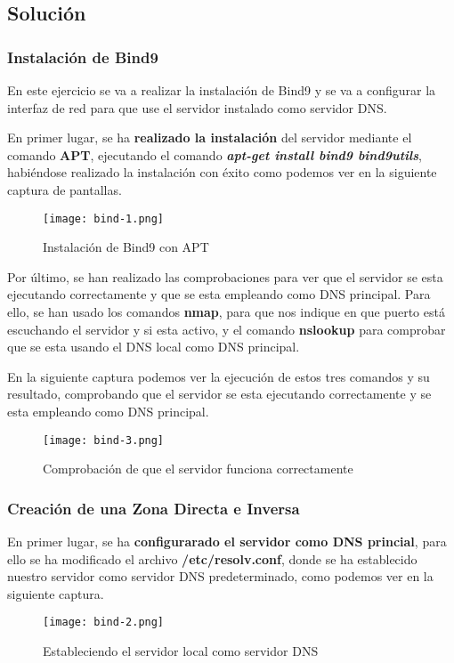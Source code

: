\subsection{Solución}
\subsubsection{Instalación de Bind9}
En este ejercicio se va a realizar la instalación de Bind9 y se va a configurar la interfaz de red para que use el servidor instalado como
servidor DNS.

En primer lugar, se ha \textbf{realizado la instalación} del servidor mediante el comando \textbf{APT}, ejecutando el comando \textbf{\textit{apt-get install bind9 bind9utils}}, habiéndose realizado la instalación con éxito como podemos ver en la siguiente captura de pantallas.

\begin{figure}[H]
    \centering
    \texttt{[image: bind-1.png]}
    \caption{Instalación de Bind9 con APT}
\end{figure}


Por último, se han realizado las comprobaciones para ver que el servidor se esta ejecutando correctamente y que se esta empleando como DNS principal. Para ello, se han usado los comandos \textbf{nmap}, para que nos indique en que puerto está escuchando el servidor y si esta activo, y el comando \textbf{nslookup} para comprobar que se esta usando el DNS local como DNS principal.

En la siguiente captura podemos ver la ejecución de estos tres comandos y su resultado, comprobando que el servidor se esta ejecutando correctamente y se esta empleando como DNS principal.

\begin{figure}[H]
    \centering
    \texttt{[image: bind-3.png]}
    \caption{Comprobación de que el servidor funciona correctamente}
\end{figure}

\subsubsection{Creación de una Zona Directa e Inversa}
En primer lugar, se ha \textbf{configurarado el servidor como DNS princial}, para ello se ha modificado  el archivo \textbf{/etc/resolv.conf}, donde se ha establecido nuestro servidor como servidor DNS predeterminado, como podemos ver en la siguiente captura.

\begin{figure}[H]
    \centering
    \texttt{[image: bind-2.png]}
    \caption{Estableciendo el servidor local como servidor DNS}
\end{figure}

